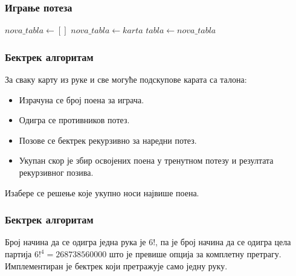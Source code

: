 \documentclass{beamer}
\begin{document}
\begin{frame}[allowframebreaks]
	\frametitle{Играње потеза}
	\begin{algorithmic}
		\State{}
		\State $nova\_tabla \gets []$
		\State{}
		\EndIf
		\State $nova\_tabla \gets karta$
		\EndIf
		\EndFor
		\State $tabla \gets nova\_tabla$
		\EndFunction
	\end{algorithmic}
\end{frame}

\begin{frame}[allowframebreaks] 
\frametitle{Бектрек алгоритам}
За сваку карту из руке и све могуће подскупове карата са талона:
\begin{itemize}
	\item {Израчуна се број поена за играча.}
	\item {Одигра се противников потез.}
	\item {Позове се бектрек рекурзивно за наредни потез.}
	\item {Укупан скор је збир освојених поена у тренутном потезу и резултата рекурзивног позива.}
\end{itemize}
	
Изабере се решење које укупно носи највише поена.
\end{frame}

\begin{frame}[allowframebreaks] 
\frametitle{Бектрек алгоритам}
Број начина да се одигра једна рука је $6!$, па је број начина да се одигра цела партија $6!^4 = 268738560000$ што је превише опција за комплетну претрагу. Имплементиран је бектрек који претражује само једну руку.
\end{frame}
\end{document}

